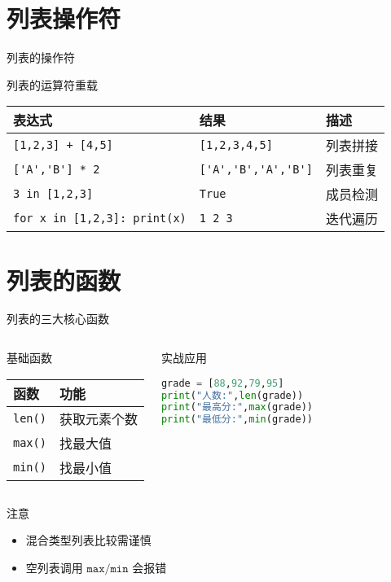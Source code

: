 \documentclass{beamer}
\begin{document}
\section{列表操作符}
\begin{frame}[fragile]{列表的操作符}
\begin{block}{列表的运算符重载}
\begin{tabular}{|l|l|p{2cm}|}
\hline
\textcolor{cuhksz1}{表达式} & \textcolor{cuhksz1}{结果} & \textcolor{cuhksz1}{描述} \\ \hline
\lstinline|[1,2,3] + [4,5]| & \lstinline|[1,2,3,4,5]| & 列表拼接\\ \hline
\lstinline|['A','B'] * 2| & \lstinline|['A','B','A','B']| & 列表重复\\ \hline
\lstinline|3 in [1,2,3]| & \lstinline|True| & 成员检测\\ \hline
\lstinline|for x in [1,2,3]: print(x)| & \lstinline|1 2 3| & 迭代遍历\\ \hline
\end{tabular}
\end{block}
\end{frame}

\section{列表的函数}
\begin{frame}[fragile]{列表的三大核心函数}
\begin{columns}[T]
\begin{block}{基础函数}
\begin{tabular}{|l|l|}
\hline
\textcolor{cuhksz2}{函数} & \textcolor{cuhksz2}{功能} \\ \hline
\lstinline|len()| & 获取元素个数 \\ \hline
\lstinline|max()| & 找最大值 \\ \hline
\lstinline|min()| & 找最小值 \\ \hline
\end{tabular}
\end{block}

\begin{exampleblock}{实战应用}
\begin{lstlisting}[language=Python]
grade = [88,92,79,95]
print("人数:",len(grade))
print("最高分:",max(grade))
print("最低分:",min(grade))
\end{lstlisting}
\end{exampleblock}
\end{columns}

\begin{alertblock}{注意}
\begin{itemize}
\item 混合类型列表比较需谨慎
\item 空列表调用 $\texttt{max/min}$ 会报错
\end{itemize}
\end{alertblock}
\end{frame}
\end{document}
